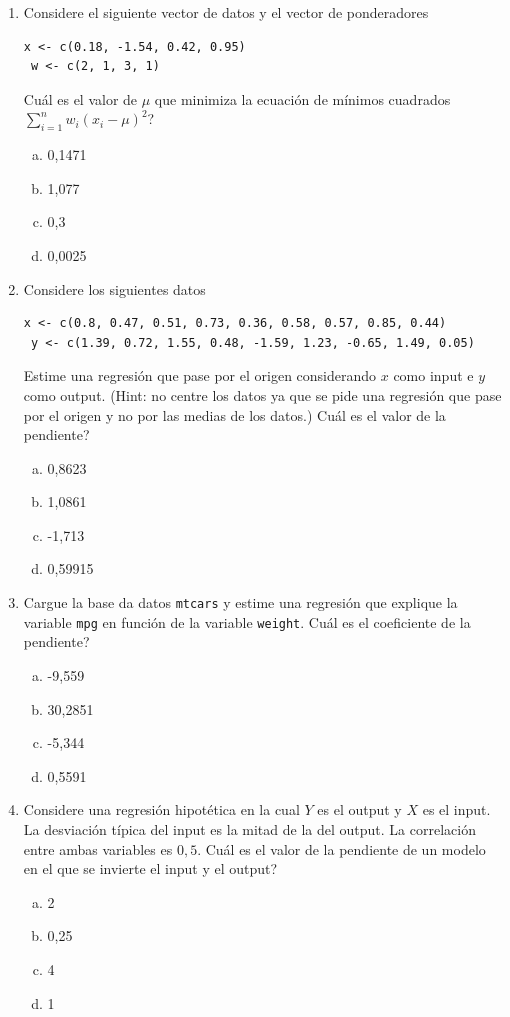 \documentclass[11pt,oneside,spanish]{article}
\theoremstyle{definition}
\theoremstyle{definition}\newtheorem{definicion}{Definicin}
\theoremstyle{definition}\newtheorem{ejemplo}{Ejemplo}
\theoremstyle{remark}\newtheorem{nota}{\textsc{Nota}}
\theoremstyle{definition}\newtheorem{proposicion}{Proposicin}
\theoremstyle{definition}\newtheorem{problema}{Problema}
\begin{document}
\begin{enumerate}[(1)]
\item Considere el siguiente vector de datos y el vector de ponderadores
\begin{lstlisting}[backgroundcolor=\color{Gray!20},frame=none,basicstyle=\ttfamily]
 x <- c(0.18, -1.54, 0.42, 0.95)
 w <- c(2, 1, 3, 1)
\end{lstlisting}
{\textquestiondown}Cu\'al es el valor de $\mu$ que minimiza la ecuaci\'on de m\'inimos cuadrados $\sum_{i=1}^n w_i(x_i-\mu)^2$?
	\begin{enumerate}[(a)]
	\item 0,1471
	\item 1,077
	\item 0,3
	\item 0,0025
	\end{enumerate}
	
\item Considere los siguientes datos
\begin{lstlisting}[backgroundcolor=\color{Gray!20},frame=none,basicstyle=\ttfamily]
 x <- c(0.8, 0.47, 0.51, 0.73, 0.36, 0.58, 0.57, 0.85, 0.44)
 y <- c(1.39, 0.72, 1.55, 0.48, -1.59, 1.23, -0.65, 1.49, 0.05)
\end{lstlisting}
Estime una regresi\'on que pase por el origen considerando $x$ como input e $y$ como output. (Hint: no centre los datos ya que se pide una regresi\'on 	que pase por el origen y no por las medias de los datos.)
{\textquestiondown}Cu\'al es el valor de la pendiente?
	\begin{enumerate}[(a)]
	\item 0,8623
	\item 1,0861
	\item -1,713
	\item 0,59915
	\end{enumerate}
	
\item Cargue la  base da datos \texttt{mtcars} y estime una regresi\'on que explique la variable \texttt{mpg} en funci\'on de la variable \texttt{weight}. {\textquestiondown}Cu\'al es el coeficiente de la pendiente?	
	\begin{enumerate}[(a)]
	\item -9,559
	\item 30,2851
	\item -5,344
	\item 0,5591
	\end{enumerate}

\item Considere una regresi\'on hipot\'etica en la cual $Y$ es el output y $X$ es el input. La desviaci\'on t\'ipica del input es la mitad de la del output. La correlaci\'on entre ambas variables es $0,5$. {\textquestiondown}Cu\'al es el valor de la pendiente de un modelo en el que se invierte el input y el output?
	\begin{enumerate}[(a)]
	\item 2
	\item 0,25
	\item 4
	\item 1
	\end{enumerate}


\end{enumerate}
\end{document}
